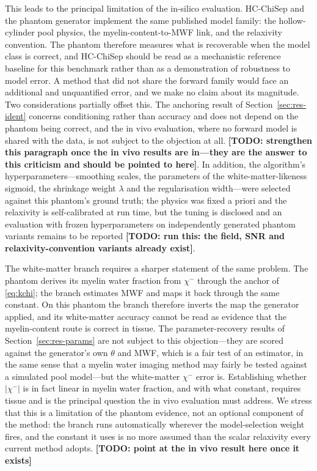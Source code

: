 \documentclass[AMA,STIX2COL,Linenumberson]{MRM}
\newcommand{\TODO}[1]{{\color{red}\textbf{[TODO: #1]}}}
\newcommand{\TODO}[1]{}
\begin{document}
This leads to the principal limitation of the in-silico evaluation. HC-ChiSep and the phantom generator implement the same published model family: the hollow-cylinder pool physics, the myelin-content-to-MWF link, and the relaxivity convention. The phantom therefore measures what is recoverable when the model class is correct, and HC-ChiSep should be read as a mechanistic reference baseline for this benchmark rather than as a demonstration of robustness to model error. A method that did not share the forward family would face an additional and unquantified error, and we make no claim about its magnitude. Two considerations partially offset this. The anchoring result of Section~\ref{sec:res-ident} concerns conditioning rather than accuracy and does not depend on the phantom being correct, and the in vivo evaluation, where no forward model is shared with the data, is not subject to the objection at all. \TODO{strengthen this paragraph once the in vivo results are in---they are the answer to this criticism and should be pointed to here}. In addition, the algorithm's hyperparameters---smoothing scales, the parameters of the white-matter-likeness sigmoid, the shrinkage weight $\lambda$ and the regularisation width---were selected against this phantom's ground truth; the physics was fixed a priori and the relaxivity is self-calibrated at run time, but the tuning is disclosed and an evaluation with frozen hyperparameters on independently generated phantom variants remains to be reported \TODO{run this: the field, SNR and relaxivity-convention variants already exist}.

\label{sec:disc-circular}The white-matter branch requires a sharper statement of the same problem. The phantom derives its myelin water fraction from $\chi^{-}$ through the anchor of \eqref{eq:kchi}; the branch estimates MWF and maps it back through the same constant. On this phantom the branch therefore inverts the map the generator applied, and its white-matter accuracy cannot be read as evidence that the myelin-content route is correct in tissue. The parameter-recovery results of Section~\ref{sec:res-params} are not subject to this objection---they are scored against the generator's own $\theta$ and MWF, which is a fair test of an estimator, in the same sense that a myelin water imaging method may fairly be tested against a simulated pool model---but the white-matter $\chi^{-}$ error is. Establishing whether $|\chi^{-}|$ is in fact linear in myelin water fraction, and with what constant, requires tissue and is the principal question the in vivo evaluation must address. We stress that this is a limitation of the phantom evidence, not an optional component of the method: the branch runs automatically wherever the model-selection weight fires, and the constant it uses is no more assumed than the scalar relaxivity every current method adopts. \TODO{point at the in vivo result here once it exists}
\end{document}

